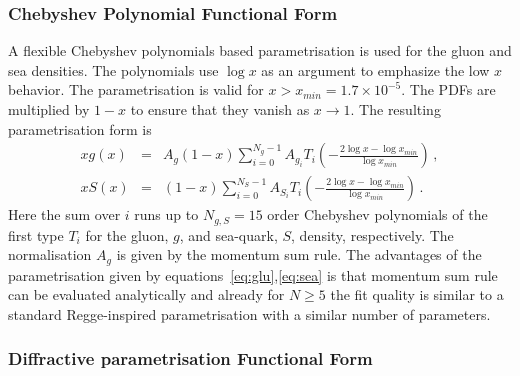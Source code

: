 \subsubsection{Chebyshev Polynomial Functional Form}
\label{sec:cheb}
A flexible Chebyshev polynomials based parametrisation is used for the gluon and sea densities. The polynomials
use $\log x$ as an argument to emphasize the low $x$ behavior. 
The parametrisation is valid for $x>x_{min} = 1.7\times 10^{-5}$. The PDFs are multiplied
by $1-x$ to ensure that they vanish as $x\to 1$. The resulting parametrisation form is 
\begin{eqnarray}
x g(x) &=& A_g \left(1-x\right) \sum_{i=0}^{N_g-1} A_{g_i} T_i \left(-\frac{\textstyle 2\log x - \log x_{min} } {\textstyle \log x_{min} } \right)\,, \label{eq:glu} \\
x S(x) &=& \left(1-x\right) \sum_{i=0}^{N_S-1} A_{S_i} T_i \left(-\frac{\textstyle 2\log x - \log x_{min} } {\textstyle \log x_{min} } \right)\,. \label{eq:sea} 
\end{eqnarray}
Here the sum over $i$ runs up to $N_{g,S}=15$ order Chebyshev polynomials of the first type $T_i$ for
the gluon, $g$, and sea-quark, $S$, density, respectively. 
The normalisation $A_g$ is given by the momentum sum rule.
The advantages of the parametrisation given by equations~\ref{eq:glu},\ref{eq:sea} is that momentum
sum rule can be evaluated analytically and  already for $N \ge 5$ the fit quality
is similar to a standard Regge-inspired parametrisation with a similar number of parameters.

\subsubsection {Diffractive parametrisation Functional Form}

